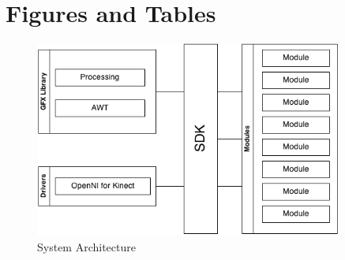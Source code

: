\documentclass[11pt,letterpaper]{article}
\begin{document}
	\section{Figures and Tables}
	\begin{figure}[h!]
		\caption{System Architecture}
		\centering
		\includegraphics[width=0.9\textwidth]{overview}
	\end{figure}
	\pagebreak
\end{document}
